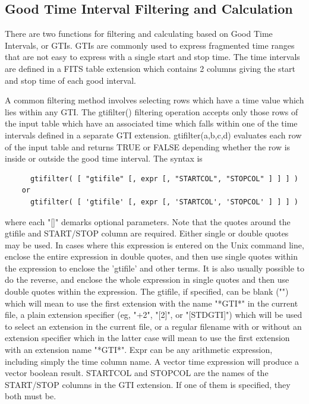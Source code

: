 \documentclass[11pt]{book}
\begin{document}
\subsection{Good Time Interval Filtering and Calculation}

    There are two functions for filtering and calculating based
    on Good Time Intervals, or GTIs.  GTIs are commonly used to
    express fragmented time ranges that are not easy to express with a
    single start and stop time.  The time intervals are defined in a
    FITS table extension which contains 2 columns giving the
    start and stop time of each good interval.

    A common filtering method involves selecting rows which have a
    time value which lies within any GTI.  The gtifilter() filtering
    operation accepts only those rows of the input table which have an
    associated time which falls within one of the time intervals
    defined in a separate GTI extension.  gtifilter(a,b,c,d) evaluates
    each row of the input table and returns TRUE or FALSE depending
    whether the row is inside or outside the good time interval.  The
    syntax is

\begin{verbatim}
      gtifilter( [ "gtifile" [, expr [, "STARTCOL", "STOPCOL" ] ] ] )
    or
      gtifilter( [ 'gtifile' [, expr [, 'STARTCOL', 'STOPCOL' ] ] ] )
\end{verbatim}
    where  each "[]" demarks optional parameters.  Note that  the quotes
    around the gtifile and START/STOP column are required.  Either single
    or double quotes may be used.  In cases where this expression is
    entered on the Unix command line, enclose the entire expression in
    double quotes, and then use single quotes within the expression to
    enclose the 'gtifile' and other terms.  It is also usually possible
    to do the reverse, and enclose the whole expression in single quotes
    and then use double quotes within the expression.  The gtifile,
    if specified,  can be blank  ("") which will  mean to use  the first
    extension  with   the name "*GTI*"  in   the current  file,  a plain
    extension  specifier (eg, "+2",  "[2]", or "[STDGTI]") which will be
    used  to  select  an extension  in  the current  file, or  a regular
    filename with or without an extension  specifier which in the latter
    case  will mean to  use the first  extension  with an extension name
    "*GTI*".  Expr can be   any arithmetic expression, including  simply
    the time  column  name.  A  vector  time expression  will  produce a
    vector boolean  result.  STARTCOL and  STOPCOL are the  names of the
    START/STOP   columns in the    GTI extension.  If   one  of them  is
    specified, they both  must be.
\end{document}
